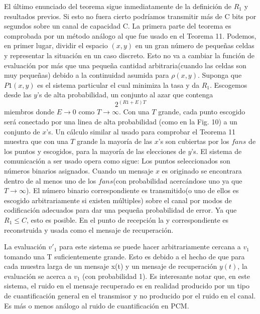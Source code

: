 	
El \'ultimo enunciado del teorema sigue inmediatamente de la definici\'on de $R_{1}$ y resultados
previos. Si esto no fuera cierto podr\'iamos transmitir m\'as de C bits por segundos sobre
un canal de capacidad C. La primera parte del teorema es comprobada por un m\'etodo an\'alogo
al que fue usado en el Teorema 11. Podemos, en primer lugar, dividir el espacio $(x,y)$ en 
un gran n\'umero de pequeñas celdas y representar la situaci\'on en un caso discreto. Esto
no va a cambiar la funci\'on de evaluaci\'on por m\'as que una pequeña cantidad arbitraria(cuando
las celdas son muy pequeñas) debido a la continuidad asumida para $\rho(x,y)$. Suponga que $P1(x,y)$
es el sistema particular el cual minimiza la tasa y da $R_{1}$. Escogemos desde las $y$'s de alta
probabilidad, un conjunto al azar que contenga
\begin{equation} 2^{(R1 + E)T} \end{equation}
miembros donde $E \rightarrow 0$ como $T \rightarrow \infty$. Con una $T$ grande, cada punto escogido 
ser\'a conectado por una linea de alta probabilidad (como en la Fig. 10) a un conjunto de $x$'s.
Un c\'alculo similar al usado para comprobar el Teorema 11 muestra que con una $T$ grande
la mayor\'ia de las $x$'s son cubiertas por los $fans$ de los puntos y escogidos, para la
mayor\'ia de las elecciones de $y$'s. El sistema de comunicaci\'on a ser usado opera como sigue:
Los puntos seleccionados son n\'umeros binarios asignados. Cuando un mensaje $x$ es originado
se encontrara dentro de al menos uno de los $fans$(con probabilidad acerc\'andose uno ya que
$T \rightarrow \infty$). El n\'umero binario correspondiente es transmitido(o uno de ellos es escogido
arbitrariamente si existen m\'ultiples) sobre el canal por modos de codificaci\'on adecuados
para dar una pequeña probabilidad de error. Ya que $R_{1} \leq C$, esto es posible. En el punto
de recepci\'on la y correspondiente es reconstruida y usada como el mensaje de recuperaci\'on.

La evaluaci\'on $v'_{1}$ para este sistema se puede hacer arbitrariamente cercana a $v_{1}$ tomando
una T suficientemente grande. Esto es debido a el hecho de que para cada muestra larga de
un mensaje x(t) y un mensaje de recuperaci\'on $y(t)$, la evaluaci\'on se acerca a $v_{1}$
(con probabilidad 1).
Es interesante notar que, en este sistema, el ruido en el mensaje recuperado es en realidad
producido por un tipo de cuantificaci\'on general en el transmisor y no producido por el ruido
en el canal. Es m\'as o menos an\'alogo al ruido de cuantificaci\'on en PCM.

